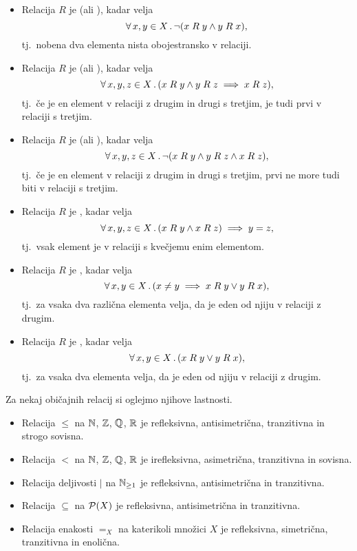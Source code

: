 \begin{definicija}
\begin{itemize}
				\item
					Relacija $R$ je  (ali ), kadar velja
					\[\xall{x, y}[X]{\lnot(x \mathrel{R} y \land y \mathrel{R} x)},\]
					tj.~nobena dva elementa nista obojestransko v relaciji.
				\item
					Relacija $R$ je  (ali ), kadar velja
					\[\all{x, y, z}[X]{x \mathrel{R} y \land y \mathrel{R} z \implies x \mathrel{R} z},\]
					tj.~če je en element v relaciji z drugim in drugi s tretjim, je tudi prvi v relaciji s tretjim.
				\item
					Relacija $R$ je  (ali ), kadar velja
					\[\xall{x, y, z}[X]{\lnot(x \mathrel{R} y \land y \mathrel{R} z \land x \mathrel{R} z)},\]
					tj.~če je en element v relaciji z drugim in drugi s tretjim, prvi ne more tudi biti v relaciji s tretjim.
				\item
					Relacija $R$ je , kadar velja
					\[\all{x, y, z}[X]{x \mathrel{R} y \land x \mathrel{R} z} \implies y = z,\]
					tj.~vsak element je v relaciji s kvečjemu enim elementom.
				\item
					Relacija $R$ je , kadar velja
					\[\all{x, y}[X]{x \neq y \implies x \mathrel{R} y \lor y \mathrel{R} x},\]
					tj.~za vsaka dva različna elementa velja, da je eden od njiju v relaciji z drugim.
				\item
					Relacija $R$ je , kadar velja
					\[\all{x, y}[X]{x \mathrel{R} y \lor y \mathrel{R} x},\]
					tj.~za vsaka dva elementa velja, da je eden od njiju v relaciji z drugim.
			\end{itemize}
		\end{definicija}
		
		\begin{zgled}
			Za nekaj običajnih relacij si oglejmo njihove lastnosti.
			\begin{itemize}
				\item
					Relacija $\leq$ na $\mathbb{N}$, $\mathbb{Z}$, $\mathbb{Q}$, $\mathbb{R}$ je refleksivna, antisimetrična, tranzitivna in strogo sovisna.
				\item
					Relacija $<$ na $\mathbb{N}$, $\mathbb{Z}$, $\mathbb{Q}$, $\mathbb{R}$ je irefleksivna, asimetrična, tranzitivna in sovisna.
				\item
					Relacija deljivosti $|$ na $\mathbb{N}_{\geq 1}$ je refleksivna, antisimetrična in tranzitivna.
				\item
					Relacija $\subseteq$ na $\mathcal{P}(X)$ je refleksivna, antisimetrična in tranzitivna.
				\item
					Relacija enakosti $=_X$ na katerikoli množici $X$ je refleksivna, simetrična, tranzitivna in enolična.
			\end{itemize}
		\end{zgled}
		
